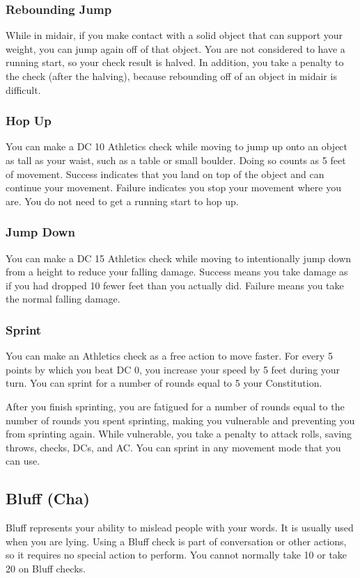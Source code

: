 \subsubsection{Rebounding Jump}\label{Rebounding Jump}
While in midair, if you make contact with a solid object that can support your weight, you can jump again off of that object. You are not considered to have a running start, so your check result is halved. In addition, you take a  penalty to the check (after the halving), because rebounding off of an object in midair is difficult.

\subsubsection{Hop Up}
You can make a DC 10 Athletics check while moving to jump up onto an object as tall as your waist, such as a table or small boulder. Doing so counts as 5 feet of movement. Success indicates that you land on top of the object and can continue your movement. Failure indicates you stop your movement where you are. You do not need to get a running start to hop up.

\subsubsection{Jump Down}
You can make a DC 15 Athletics check while moving to intentionally jump down from a height to reduce your falling damage. Success means you take damage as if you had dropped 10 fewer feet than you actually did. Failure means you take the normal falling damage.

\subsubsection{Sprint}\label{Sprint}
You can make an Athletics check as a free action to move faster. For every 5 points by which you beat DC 0, you increase your speed by 5 feet during your turn. You can sprint for a number of rounds equal to 5 \add your Constitution.

After you finish sprinting, you are fatigued for a number of rounds equal to the number of rounds you spent sprinting, making you vulnerable and preventing you from sprinting again. While vulnerable, you take a  penalty to attack rolls, saving throws, checks, DCs, and AC. You can sprint in any movement mode that you can use.

\subsection{Bluff (Cha)}
Bluff represents your ability to mislead people with your words. It is usually used when you are lying. Using a Bluff check is part of conversation or other actions, so it requires no special action to perform. You cannot normally take 10 or take 20 on Bluff checks.

